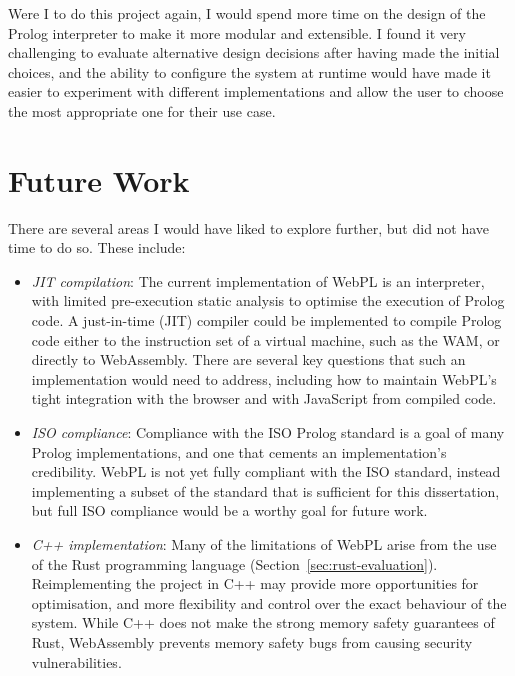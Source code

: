 Were I to do this project again, I would spend more time on the design of the Prolog interpreter to make it more modular and extensible. I found it very challenging to evaluate alternative design decisions after having made the initial choices, and the ability to configure the system at runtime would have made it easier to experiment with different implementations and allow the user to choose the most appropriate one for their use case.

\section{Future Work}

There are several areas I would have liked to explore further, but did not have time to do so. These include:

\begin{itemize}
\item \emph{JIT compilation}: The current implementation of WebPL is an interpreter, with limited pre-execution static analysis to optimise the execution of Prolog code. A just-in-time (JIT) compiler could be implemented to compile Prolog code either to the instruction set of a virtual machine, such as the WAM, or directly to WebAssembly. There are several key questions that such an implementation would need to address, including how to maintain WebPL's tight integration with the browser and with JavaScript from compiled code.
\item \emph{ISO compliance}: Compliance with the ISO Prolog standard \cite{isoInformationtechnologyProgramming1995} is a goal of many Prolog implementations, and one that cements an implementation's credibility. WebPL is not yet fully compliant with the ISO standard, instead implementing a subset of the standard that is sufficient for this dissertation, but full ISO compliance would be a worthy goal for future work.
\item \emph{C++ implementation}: Many of the limitations of WebPL arise from the use of the Rust programming language (Section~\ref{sec:rust-evaluation}). Reimplementing the project in C++ may provide more opportunities for optimisation, and more flexibility and control over the exact behaviour of the system. While C++ does not make the strong memory safety guarantees of Rust, WebAssembly prevents memory safety bugs from causing security vulnerabilities.
\end{itemize}